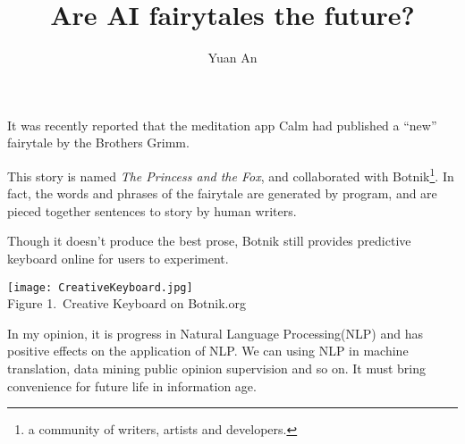 \documentclass[a4paper, 12pt]{article}
\title{Are AI fairytales the future?}
\author{Yuan An}
\begin{document}
\maketitle

It was recently reported that the meditation app Calm had published a ``new''  fairytale by the Brothers Grimm.
\par
This story is named \emph{The Princess and the Fox}, and collaborated with Botnik\footnote{a community of writers, artists and developers.}. In fact, the words and phrases of the fairytale are generated by program, and are pieced together sentences to story by human writers. 
\par
Though it doesn't produce the best prose, Botnik still provides predictive keyboard online for users to experiment.

\begin{center}
	\texttt{[image: CreativeKeyboard.jpg]}\\
	Figure 1.~Creative Keyboard on Botnik.org
\end{center}

In my opinion, it is progress in Natural Language Processing(NLP) and  has positive effects on the application of NLP. We can using NLP in machine translation, data mining public opinion supervision and so on. It must  bring convenience for future life in information age.
\end{document}
